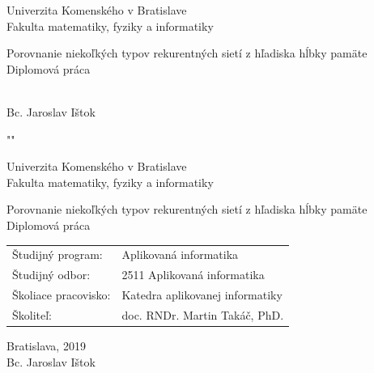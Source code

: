 \documentclass[12pt, oneside]{book}
\def\mfrok{2019}
\def\mfnazov{Porovnanie niekoľkých typov rekurentných sietí z hľadiska hĺbky pamäte}
\def\mftyp{Diplomová práca}
\def\mfautor{Bc. Jaroslav Ištok}
\def\mfskolitel{doc. RNDr. Martin Takáč, PhD.}
\def\mfmiesto{Bratislava, \mfrok}
\def\mfodbor{2511  Aplikovaná informatika}
\def\program{ Aplikovaná informatika }
\def\mfpracovisko{ Katedra aplikovanej informatiky }
\begin{document}
     

\thispagestyle{empty}

\begin{center}
\sc\large
 Univerzita Komenského v Bratislave\\
 Fakulta matematiky, fyziky a informatiky
\vfill

{\LARGE\mfnazov}\\
\mftyp

\end{center}

\vfill

{\sc\large 
\noindent \mfrok\\
\mfautor
}

\eject %


\thispagestyle{empty}
\noindent
"" 
\begin{center}
\sc  
\large
 Univerzita Komenského v Bratislave\\
 Fakulta matematiky, fyziky a informatiky

\vfill

{\LARGE\mfnazov}\\
\mftyp
\end{center}

\vfill

\noindent
\begin{tabular}{ll}
Študijný program: & \program \\
Študijný odbor: & \mfodbor \\
Školiace pracovisko: & \mfpracovisko \\
Školiteľ: & \mfskolitel \\
\end{tabular}


\vfill


\noindent \mfmiesto\\
\mfautor

\eject %




\end{document}
